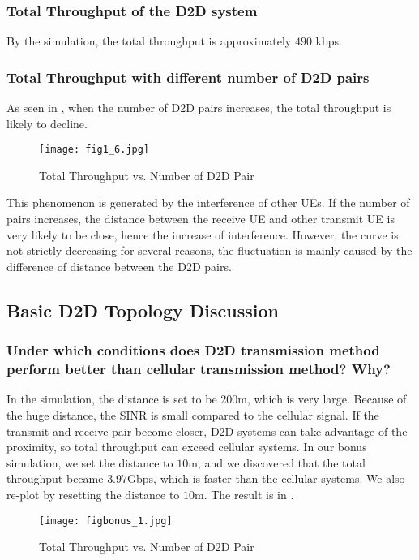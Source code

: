 \documentclass[conference]{IEEEtran}
\begin{document}
\subsubsection{Total Throughput of the D2D system}
By the simulation, the total throughput is approximately $490$ kbps.
\subsubsection{Total Throughput with different number of D2D pairs}
As seen in , when the number of D2D pairs increases, the total throughput is likely to decline.

\begin{figure}[htbp]
    \centering
    \texttt{[image: fig1\_6.jpg]}
    \caption{Total Throughput vs. Number of D2D Pair}
    \label{fig:d2d_num}
\end{figure}
 This phenomenon is generated by the interference of other UEs. If the number of pairs increases, the distance between the receive UE and other transmit UE is very likely to be close, hence the increase of interference. However, the curve is not strictly decreasing for several reasons, the fluctuation is mainly caused by the difference of distance between the D2D pairs.
\subsection{Basic D2D Topology Discussion}
\subsubsection{Under which conditions does D2D transmission method perform better than cellular transmission method? Why?}
In the simulation, the distance is set to be $200$m, which is very large. Because of the huge distance, the SINR is small compared to the cellular signal. If the transmit and receive pair become closer, D2D systems can take advantage of the proximity, so total throughput can exceed cellular systems. In our bonus simulation, we set the distance to $10$m, and we discovered that the total throughput became $3.97$Gbps, which is faster than the cellular systems. We also re-plot  by resetting the distance to $10$m. The result is in .
\begin{figure}[htbp]
    \centering
    \texttt{[image: figbonus\_1.jpg]}
    \caption{Total Throughput vs. Number of D2D Pair}
    \label{fig:d2d_num_bonus}
\end{figure}
\end{document}

